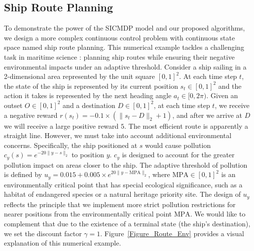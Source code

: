 \subsection{Ship Route Planning}
To demonstrate the power of the SICMDP model and our proposed algorithms, we design a more complex continuous control problem with continuous state space named ship route planning.
This numerical example tackles a challenging task in maritime science \citep{wan2016four, wan2016pollution}: planning ship routes while ensuring their negative environmental impacts under an adaptive threshold.
Consider a ship sailing in a 2-dimensional area represented by the unit square $[0,1]^2$. 
At each time step $t$, the state of the ship is represented by its current position $s_t\in[0,1]^2$ and the action it takes is represented by the next heading angle $a_t\in[0,2\pi)$.
Given an outset $O\in [0,1]^2$ and a destination $D\in[0,1]^2$, at each time step $t$, we receive a negative reward $r(s_t)=-0.1 \times (\|s_t-D \|_2+1)$, and after we arrive at $D$ we will receive a large positive reward $5$.
The most efficient route is apparently a straight line.
However, we must take into account additional environmental concerns.
Specifically, the ship positioned at $s$ would cause pollution $c_y(s)=e^{-20\|y-s\|_2}$ to position $y$.
$c_y$ is designed to account for the greater pollution impact on areas closer to the ship.
The adaptive threshold of pollution is defined by $u_y=0.015+0.005\times e^{20\|y-\text{MPA}\|_2}$, where $\text{MPA}\in [0, 1]^2$ is an environmentally critical point that has special ecological significance, such as a habitat of endangered species or a natural heritage priority site.
The design of $u_y$ reflects the principle that we implement more strict pollution restrictions for nearer positions from the environmentally critical point $\text{MPA}$.
We would like to complement that due to the existence of a terminal state (the ship's destination), we set the discount factor $\gamma=1$.
Figure~\ref{Figure_Route_Env} provides a visual explanation of this numerical example.

